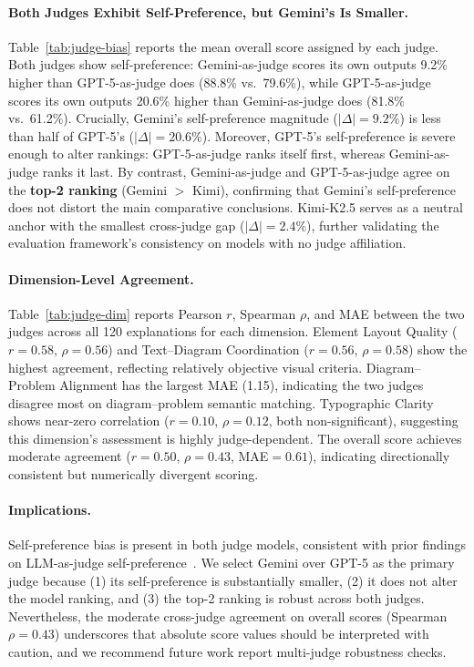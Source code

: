 \documentclass[11pt]{article}
\begin{document}
\paragraph{Both Judges Exhibit Self-Preference, but Gemini's Is Smaller.} Table~\ref{tab:judge-bias} reports the mean overall score assigned by each judge. Both judges show self-preference: Gemini-as-judge scores its own outputs 9.2\% higher than GPT-5-as-judge does (88.8\% vs.\ 79.6\%), while GPT-5-as-judge scores its own outputs 20.6\% higher than Gemini-as-judge does (81.8\% vs.\ 61.2\%). Crucially, Gemini's self-preference magnitude ($|\Delta|{=}9.2\%$) is less than half of GPT-5's ($|\Delta|{=}20.6\%$). Moreover, GPT-5's self-preference is severe enough to alter rankings: GPT-5-as-judge ranks itself first, whereas Gemini-as-judge ranks it last. By contrast, Gemini-as-judge and GPT-5-as-judge agree on the \textbf{top-2 ranking} (Gemini $>$ Kimi), confirming that Gemini's self-preference does not distort the main comparative conclusions. Kimi-K2.5 serves as a neutral anchor with the smallest cross-judge gap ($|\Delta|{=}2.4\%$), further validating the evaluation framework's consistency on models with no judge affiliation.

\paragraph{Dimension-Level Agreement.} Table~\ref{tab:judge-dim} reports Pearson $r$, Spearman $\rho$, and MAE between the two judges across all 120 explanations for each dimension. Element Layout Quality ($r{=}0.58$, $\rho{=}0.56$) and Text--Diagram Coordination ($r{=}0.56$, $\rho{=}0.58$) show the highest agreement, reflecting relatively objective visual criteria. Diagram--Problem Alignment has the largest MAE (1.15), indicating the two judges disagree most on diagram--problem semantic matching. Typographic Clarity shows near-zero correlation ($r{=}0.10$, $\rho{=}0.12$, both non-significant), suggesting this dimension's assessment is highly judge-dependent. The overall score achieves moderate agreement ($r{=}0.50$, $\rho{=}0.43$, MAE${=}0.61$), indicating directionally consistent but numerically divergent scoring.

\paragraph{Implications.} Self-preference bias is present in both judge models, consistent with prior findings on LLM-as-judge self-preference~\citep{zheng2023judging}. We select Gemini over GPT-5 as the primary judge because (1) its self-preference is substantially smaller, (2) it does not alter the model ranking, and (3) the top-2 ranking is robust across both judges. Nevertheless, the moderate cross-judge agreement on overall scores (Spearman $\rho{=}0.43$) underscores that absolute score values should be interpreted with caution, and we recommend future work report multi-judge robustness checks.
\end{document}
